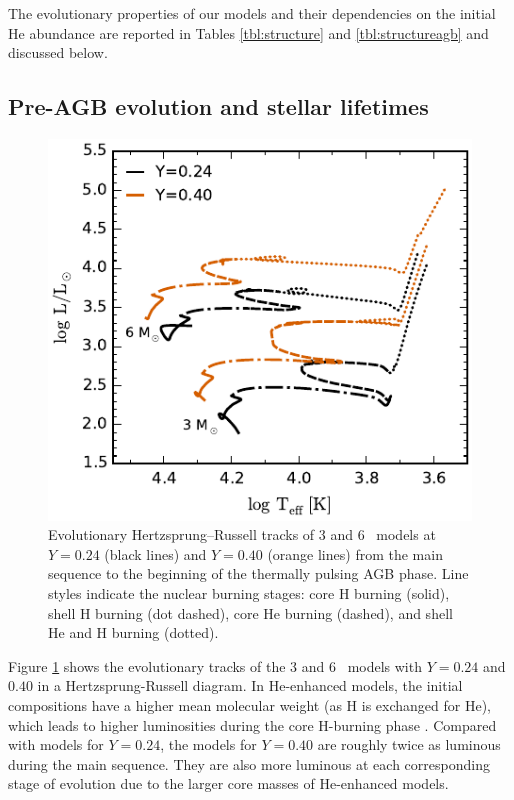 The evolutionary properties of our models and their dependencies on the initial He abundance are reported in Tables \ref{tbl:structure} and \ref{tbl:structureagb} and discussed below.

\subsection{Pre-AGB evolution and stellar lifetimes}
\begin{figure}
 \begin{center}\includegraphics[width=\columnwidth]{fig-hrdiagram.pdf}\end{center}
 \caption[Evolutionary Hertzsprung--Russell tracks of 3 and 6 \Msun\ models at $Y=0.24$ and $Y=0.40$ from the main sequence to the beginning of the thermally pulsing AGB phase.]{Evolutionary Hertzsprung--Russell tracks of 3 and 6 \Msun\ models at $Y=0.24$ (black lines) and $Y=0.40$ (orange lines) from the main sequence to the beginning of the thermally pulsing AGB phase. Line styles indicate the nuclear burning stages: core H burning (solid), shell H burning (dot dashed), core He burning (dashed), and shell He and H burning (dotted).\label{fig:hrdiag}}
\end{figure}

Figure \ref{fig:hrdiag} shows the evolutionary tracks of the 3 and 6 \Msun\ models with $Y=0.24$ and $0.40$ in a Hertzsprung-Russell diagram. In He-enhanced models, the initial compositions have a higher mean molecular weight (as H is exchanged for He), which leads to higher luminosities during the core H-burning phase \citep{Roeser:1975ws}. Compared with models for $Y=0.24$, the models for $Y=0.40$ are roughly twice as luminous during the main sequence. They are also more luminous at each corresponding stage of evolution due to the larger core masses of He-enhanced models.

